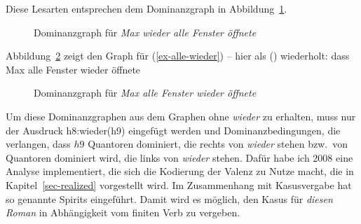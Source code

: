 \noindent
Diese Lesarten entsprechen dem Dominanzgraph in Abbildung~\ref{Abbildung-Max-wieder-alle-Fenster-oeffnete}.
\begin{figure}
\caption{Dominanzgraph für \emph{Max wieder alle Fenster öffnete}\label{Abbildung-Max-wieder-alle-Fenster-oeffnete}}
\end{figure}
Abbildung~\ref{Abbildung-Max-alle-Fenster-wieder-oeffnete} zeigt den Graph für (\ref{ex-alle-wieder}) -- hier als () wiederholt:
\ea
\label{ex-alle-wieder-zwei}
dass Max alle Fenster wieder öffnete
\z
\begin{figure}
\caption{Dominanzgraph für \emph{Max alle Fenster wieder öffnete}\label{Abbildung-Max-alle-Fenster-wieder-oeffnete}}
\end{figure}
Um diese Dominanzgraphen aus dem Graphen ohne \emph{wieder} zu erhalten, muss nur der Ausdruck h8:wieder(h9)
eingefügt werden und Dominanzbedingungen, die verlangen, dass $h9$ Quantoren dominiert, die rechts
von \emph{wieder} stehen bzw.\ von Quantoren dominiert wird, die links von \emph{wieder}
stehen. Dafür habe ich 2008 eine Analyse implementiert, die sich die Kodierung der Valenz zu Nutze
macht, die in Kapitel~\ref{sec-realized} vorgestellt wird. Im Zusammenhang mit Kasusvergabe hat
\citet{Meurers99b} so genannte Spirits eingeführt. Damit wird es möglich, den Kasus für \emph{diesen
  Roman} in Abhängigkeit vom finiten Verb zu vergeben.
